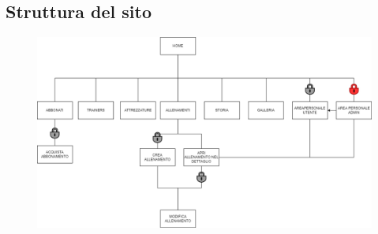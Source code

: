 \documentclass[a4paper]{article}
\begin{document}
    \subsection{Struttura del sito}
    \begin{figure}
        \centering
        \includegraphics[scale=0.3]{immagini/mappa sito.drawio.png} 
    \end{figure}
\end{document}
